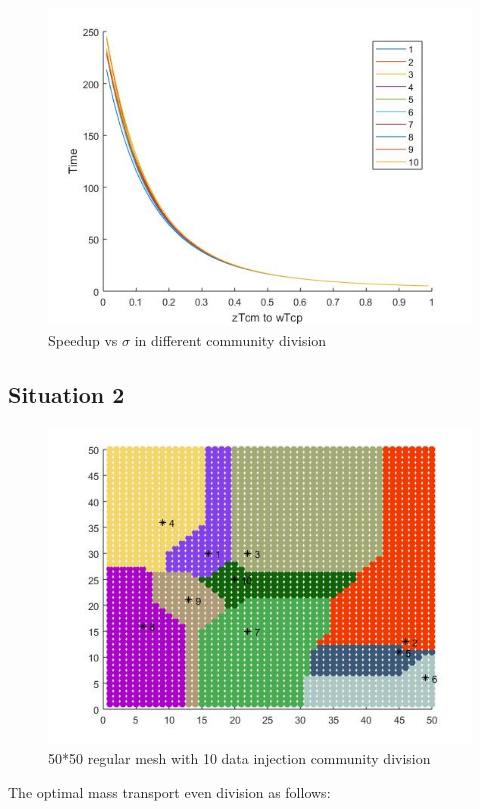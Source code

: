 \begin{figure}[h]
\centering\includegraphics[width=0.8\linewidth]{figure/voronoicurve3}
\caption{Speedup vs $\sigma$ in different community division}
\label{voronoicurve3}
\end{figure}

\subsection{Situation 2}

\begin{figure}[h]
\centering\includegraphics[width=0.8\linewidth]{figure/voronoiinit}
\caption{50*50 regular mesh with 10 data injection community division}
\label{voronoiinit}
\end{figure}

The optimal mass transport even division as follows:
\\

